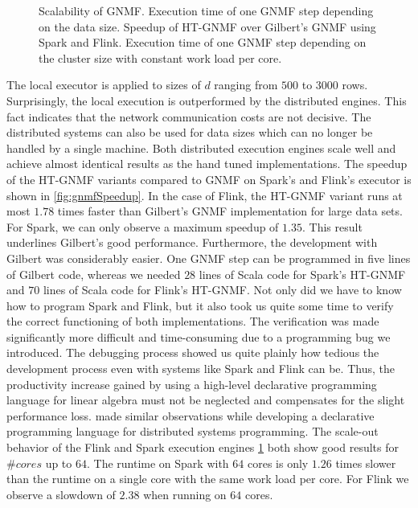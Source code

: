 \begin{figure}[!h]
\begin{subfigure}{\dualpgfwidth}
		\caption{}
		\label{fig:nmfNodesRuntime}
	\end{subfigure}
	\caption{Scalability of GNMF.  Execution time of one GNMF step depending on the data size.  Speedup of HT-GNMF over Gilbert's GNMF using Spark and Flink.  Execution time of one GNMF step depending on the cluster size with constant work load per core.}
	\label{fig:nmfBenchmark}
\end{figure}

The local executor is applied to sizes of $d$ ranging from $500$ to $3000$ rows.
Surprisingly, the local execution is outperformed by the distributed engines.
This fact indicates that the network communication costs are not decisive.
The distributed systems can also be used for data sizes which can no longer be handled by a single machine.
Both distributed execution engines scale well and achieve almost identical results as the hand tuned implementations.
The speedup of the HT-GNMF variants compared to GNMF on Spark's and Flink's executor is shown in \cref{fig:gnmfSpeedup}.
In the case of Flink, the HT-GNMF variant runs at most $1.78$ times faster than Gilbert's GNMF implementation for large data sets.
For Spark, we can only observe a maximum speedup of $1.35$.
This result underlines Gilbert's good performance.
Furthermore, the development with Gilbert was considerably easier.
One GNMF step can be programmed in five lines of Gilbert code, whereas we needed $28$ lines of Scala code for Spark's HT-GNMF and $70$ lines of Scala code for Flink's HT-GNMF.
Not only did we have to know how to program Spark and Flink, but it also took us quite some time to verify the correct functioning of both implementations.
The verification was made significantly more difficult and time-consuming due to a programming bug we introduced.
The debugging process showed us quite plainly how tedious the development process even with systems like Spark and Flink can be.
Thus, the productivity increase gained by using a high-level declarative programming language for linear algebra must not be neglected and compensates for the slight performance loss.
\cite{alvaro:2010a} made similar observations while developing a declarative programming language for distributed systems programming.
The scale-out behavior of the Flink and Spark execution engines \cref{fig:nmfNodesRuntime} both show good results for $\#cores$ up to $64$.
The runtime on Spark with $64$ cores is only $1.26$ times slower than the runtime on a single core with the same work load per core.
For Flink we observe a slowdown of $2.38$ when running on $64$ cores.

